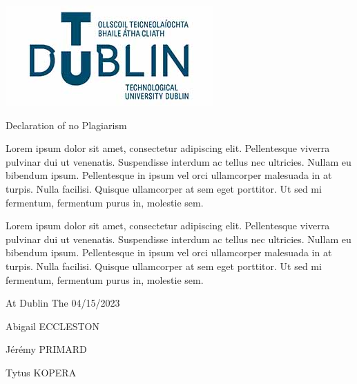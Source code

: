 \documentclass[../main.tex]{subfiles}
\begin{document}
\begin{PageVierge}

	\includegraphics[height=0.25\textwidth]{tu_dublin_logo.jpg}

	\begin{center}
		\fontsize{14}{18} 
		\selectfont
		\bf

        Declaration of no Plagiarism

	\end{center}

	\vspace{3.5cm}

Lorem ipsum dolor sit amet, consectetur adipiscing elit. Pellentesque viverra pulvinar dui ut venenatis.
Suspendisse interdum ac tellus nec ultricies. Nullam eu bibendum ipsum. Pellentesque in ipsum vel orci 
ullamcorper malesuada in at turpis. Nulla facilisi. Quisque ullamcorper at sem eget porttitor. Ut sed mi fermentum, 
fermentum purus in, molestie sem.

	\vspace{1cm}

Lorem ipsum dolor sit amet, consectetur adipiscing elit. Pellentesque viverra pulvinar dui ut venenatis.
Suspendisse interdum ac tellus nec ultricies. Nullam eu bibendum ipsum. Pellentesque in ipsum vel orci 
ullamcorper malesuada in at turpis. Nulla facilisi. Quisque ullamcorper at sem eget porttitor. Ut sed mi fermentum, 
fermentum purus in, molestie sem.

	\vspace{1cm}

	At Dublin
	\tab
	The 04/15/2023


	\begin{flushright}

        Abigail ECCLESTON

        Jérémy PRIMARD
        
        Tytus KOPERA

	\end{flushright}


\end{PageVierge}
\end{document}
